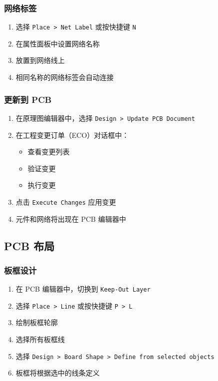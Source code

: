 \subsubsection{网络标签}


\begin{enumerate}
  \item 选择 \lstinline{Place > Net Label} 或按快捷键 \lstinline{N}
  \item 在属性面板中设置网络名称
  \item 放置到网络线上
  \item 相同名称的网络标签会自动连接
\end{enumerate}

\subsubsection{更新到 PCB}


\begin{enumerate}
  \item 在原理图编辑器中，选择 \lstinline{Design > Update PCB Document}
  \item 在工程变更订单（ECO）对话框中：
    \begin{itemize}
      \item 查看变更列表
      \item 验证变更
      \item 执行变更
    \end{itemize}
  \item 点击 \lstinline{Execute Changes} 应用变更
  \item 元件和网络将出现在 PCB 编辑器中
\end{enumerate}

\subsection{PCB 布局}

\subsubsection{板框设计}


\begin{enumerate}
  \item 在 PCB 编辑器中，切换到 \lstinline{Keep-Out Layer}
  \item 选择 \lstinline{Place > Line} 或按快捷键 \lstinline{P > L}
  \item 绘制板框轮廓
  \item 选择所有板框线
  \item 选择 \lstinline{Design > Board Shape > Define from selected objects}
  \item 板框将根据选中的线条定义
\end{enumerate}

